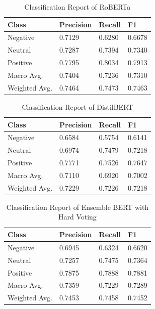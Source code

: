 \documentclass[runningheads]{llncs}
\begin{document}
\begin{table}[!ht]
    \centering
    \caption{Classification Report of RoBERTa}
    \begin{tabular}{llll}
        \toprule
        \textbf{Class} & \textbf{Precision} & \textbf{Recall} & \textbf{F1}\\
        \midrule
         Negative &  0.7129 &  0.6280 &  0.6678 \\
         Neutral  &  0.7287 &  0.7394 &  0.7340 \\
         Positive &  0.7795 &  0.8034 &  0.7913 \\
        \midrule
   Macro Avg. &  0.7404 &  0.7236 &  0.7310 \\
Weighted Avg. &  0.7464 &  0.7473 &  0.7463 \\
        \bottomrule
    \end{tabular}
\end{table}

\begin{table}[!ht]
    \centering
    \caption{Classification Report of DistilBERT}
    \begin{tabular}{llll}
        \toprule
        \textbf{Class} & \textbf{Precision} & \textbf{Recall} & \textbf{F1}\\
        \midrule
         Negative &  0.6584 &  0.5754 &  0.6141 \\
         Neutral  &  0.6974 &  0.7479 &  0.7218 \\
         Positive &  0.7771 &  0.7526 &  0.7647 \\
        \midrule
   Macro Avg. &  0.7110 &  0.6920 &  0.7002 \\
Weighted Avg. &  0.7229 &  0.7226 &  0.7218 \\
        \bottomrule
    \end{tabular}
\end{table}

\begin{table}[!ht]
    \centering
    \caption{Classification Report of Ensemble BERT with Hard Voting}
    \begin{tabular}{llll}
        \toprule
        \textbf{Class} & \textbf{Precision} & \textbf{Recall} & \textbf{F1}\\
        \midrule
         Negative &  0.6945 &  0.6324 &  0.6620 \\ 
         Neutral  &  0.7257 &  0.7475 &  0.7364 \\ 
         Positive &  0.7875 &  0.7888 &  0.7881 \\ 
        \midrule
   Macro Avg. &  0.7359 &  0.7229 &  0.7289 \\ 
Weighted Avg. &  0.7453 &  0.7458 &  0.7452 \\ 
        \bottomrule
    \end{tabular}
\end{table}
\end{document}
